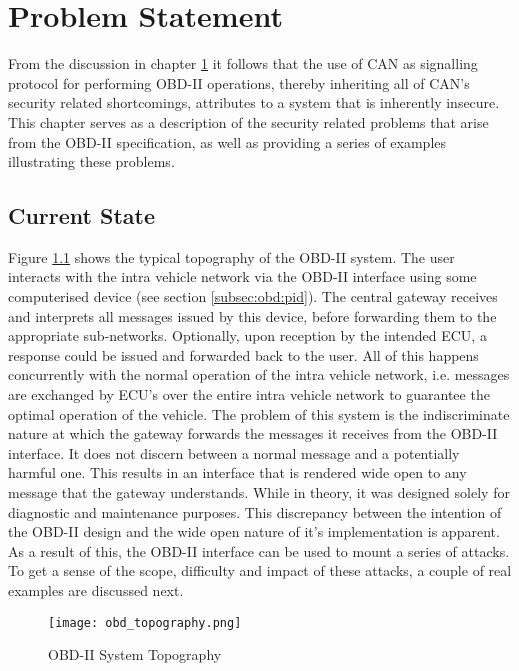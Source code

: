 
\chapter{Problem Statement}
\label{chap:problem_statement}

From the discussion in chapter \ref{chap:problem_statement} it follows that the use of CAN as signalling protocol for  performing OBD-II operations, thereby inheriting all of CAN's security related shortcomings, attributes to a system that is inherently insecure. This chapter serves as a description of the security related problems that arise from the OBD-II specification, as well as providing a series of examples illustrating these problems.

\section{Current State}
\label{sec:current_state}

Figure \ref{fig:topography} shows the typical topography of the OBD-II system. The user interacts with the intra vehicle network via the OBD-II interface using some computerised device (see section \ref{subsec:obd:pid}). The central gateway receives and interprets all messages issued by this device, before forwarding them to the appropriate sub-networks. Optionally, upon reception by the intended ECU, a response could be issued and forwarded back to the user. All of this happens concurrently with the normal operation of the intra vehicle network, i.e. messages are exchanged by ECU's over the entire intra vehicle network to guarantee the optimal operation of the vehicle. The problem of this system is the indiscriminate nature at which the gateway forwards the messages it receives from the OBD-II interface. It does not discern between a normal message and a potentially harmful one. This results in an interface that is rendered wide open to any message that the gateway understands. While in theory, it was designed solely for diagnostic and maintenance purposes. This discrepancy between the intention of the OBD-II design and the wide open nature of it's implementation is apparent. As a result of this, the OBD-II interface can be used to mount a series of attacks. To get a sense of the scope, difficulty and impact of these attacks, a couple of real examples are discussed next.

\begin{figure}[h]
	\label{fig:topography}
	\centering
	\texttt{[image: obd\_topography.png]}
	\caption{OBD-II System Topography}
\end{figure}

